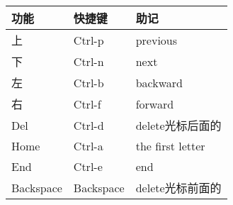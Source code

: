\documentclass[11pt]{article}
\begin{document}
\begin{enumerate}
\begin{center}
\begin{tabular}{lll}
功能 & 快捷键 & 助记\\
\hline
上 & Ctrl-p & previous\\
下 & Ctrl-n & next\\
左 & Ctrl-b & backward\\
右 & Ctrl-f & forward\\
Del & Ctrl-d & delete光标后面的\\
Home & Ctrl-a & the first letter\\
End & Ctrl-e & end\\
Backspace & Backspace & delete光标前面的\\
\end{tabular}
\end{center}
\end{enumerate}
\end{document}
